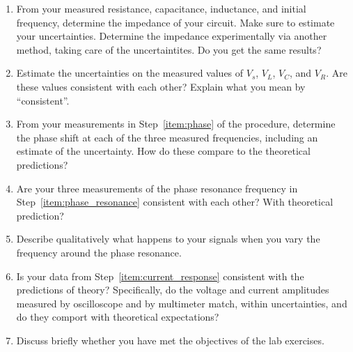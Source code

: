 \documentclass[12pt]{article}
\begin{document}
\begin{enumerate}
\item From your measured resistance, capacitance, inductance, and
  initial frequency, determine the impedance of your circuit.  Make
  sure to estimate your uncertainties.  Determine the impedance
  experimentally via another method, taking care of the
  uncertaintites. %
  Do you get the same results?
\item Estimate the uncertainties on the measured values of $V_s$,
  $V_L$, $V_C$, and $V_R$.  Are these values consistent with each
  other?  Explain what you mean by ``consistent''.
\item From your measurements in Step~\ref{item:phase} of the
  procedure, determine the phase shift at each of the three measured
  frequencies, including an estimate of the uncertainty.  How do these
  compare to the theoretical predictions? 
\item Are your three measurements of the phase resonance frequency in
  Step~\ref{item:phase_resonance} consistent with each other?  With
  theoretical prediction?
\item Describe qualitatively what happens to your signals when you
  vary the frequency around the phase resonance.
\item Is your data from Step~\ref{item:current_response} consistent
  with the predictions of theory?  Specifically, do the voltage and
  current amplitudes measured by oscilloscope and by multimeter match,
  within uncertainties, and do they comport with theoretical
  expectations?

\item Discuss briefly whether you have met the objectives of the lab
  exercises.
\end{enumerate}
\end{document}
